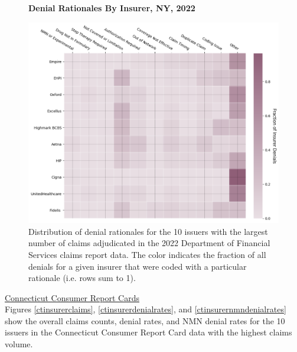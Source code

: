 \documentclass[12pt, a4paper,twoside]{report}
\theoremstyle{plain} %
\theoremstyle{definition} %
\theoremstyle{remark} %
\numberwithin{equation}{chapter}
\begin{document}
		\begin{figure}[h!]
			\centering
			\textbf{Denial Rationales By Insurer, NY, 2022}\par\medskip
			\includegraphics[width=\columnwidth]{images/ny_claim_reports/insurer_vs_denial_cat.png}
			\caption{Distribution of denial rationales for the 10 issuers with the largest number of claims adjudicated in the 2022 Department of Financial Services claims report data. The color indicates the fraction of all denials for a given insurer that were coded with a particular rationale (i.e. rows sum to 1).}
			\label{nydenialrationalesbyinsurer}
		\end{figure}
		
		\clearpage
		


		
		\underline{Connecticut Consumer Report Cards}\\
		
		
		Figures \ref{ctinsurerclaims}, \ref{ctinsurerdenialrates}, and \ref{ctinsurernmndenialrates} show the overall claims counts, denial rates, and NMN denial rates for the 10 issuers in the Connecticut Consumer Report Card data with the highest claims volume.
\end{document}
